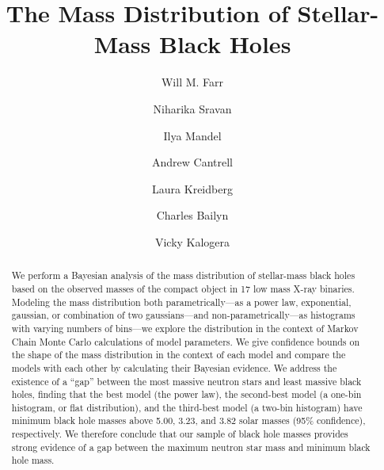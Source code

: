\documentclass[preprint]{aastex}
\begin{document}
\title{The Mass Distribution of Stellar-Mass Black Holes}

\author{Will M. Farr \and Niharika Sravan \and Ilya Mandel} 



\author{Andrew Cantrell \and Laura Kreidberg \and Charles Bailyn}



\author{Vicky Kalogera} 



\begin{abstract}
  We perform a Bayesian analysis of the mass distribution of
  stellar-mass black holes based on the observed masses of the compact
  object in 17 low mass X-ray binaries.  Modeling the mass
  distribution both parametrically---as a power law, exponential,
  gaussian, or combination of two gaussians---and
  non-parametrically---as histograms with varying numbers of
  bins---we explore the distribution in the context of Markov Chain
  Monte Carlo calculations of model parameters.  We give confidence
  bounds on the shape of the mass distribution in the context of each
  model and compare the models with each other by calculating their
  Bayesian evidence.  We address the existence of a ``gap'' between
  the most massive neutron stars and least massive black holes,
  finding that the best model (the power law), the second-best model
  (a one-bin histogram, or flat distribution), and the third-best
  model (a two-bin histogram) have minimum black hole masses above
  5.00, 3.23, and 3.82 solar masses (95\% confidence), respectively.
  We therefore conclude that our sample of black hole masses provides
  strong evidence of a gap between the maximum neutron star mass and
  minimum black hole mass.
\end{abstract}
\end{document}
